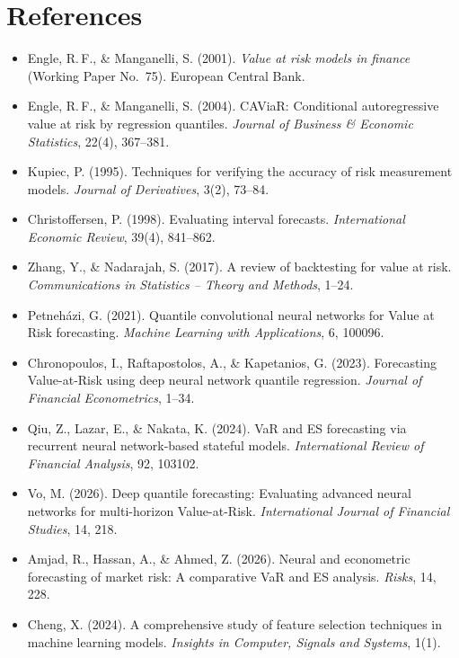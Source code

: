 \documentclass[10pt,a4paper]{article}
\begin{document}
\section*{References}
\begin{small}
\begin{itemize}[leftmargin=1.2em]
  \item Engle, R.\,F., \& Manganelli, S. (2001). \emph{Value at risk models in finance} (Working Paper No.~75). European Central Bank.
  \item Engle, R.\,F., \& Manganelli, S. (2004). CAViaR: Conditional autoregressive value at risk by regression quantiles. \emph{Journal of Business \& Economic Statistics}, 22(4), 367--381.
  \item Kupiec, P. (1995). Techniques for verifying the accuracy of risk measurement models. \emph{Journal of Derivatives}, 3(2), 73--84.
  \item Christoffersen, P. (1998). Evaluating interval forecasts. \emph{International Economic Review}, 39(4), 841--862.
  \item Zhang, Y., \& Nadarajah, S. (2017). A review of backtesting for value at risk. \emph{Communications in Statistics -- Theory and Methods}, 1--24.
  \item Petneházi, G. (2021). Quantile convolutional neural networks for Value at Risk forecasting. \emph{Machine Learning with Applications}, 6, 100096.
  \item Chronopoulos, I., Raftapostolos, A., \& Kapetanios, G. (2023). Forecasting Value-at-Risk using deep neural network quantile regression. \emph{Journal of Financial Econometrics}, 1--34.
  \item Qiu, Z., Lazar, E., \& Nakata, K. (2024). VaR and ES forecasting via recurrent neural network-based stateful models. \emph{International Review of Financial Analysis}, 92, 103102.
  \item Vo, M. (2026). Deep quantile forecasting: Evaluating advanced neural networks for multi-horizon Value-at-Risk. \emph{International Journal of Financial Studies}, 14, 218.
  \item Amjad, R., Hassan, A., \& Ahmed, Z. (2026). Neural and econometric forecasting of market risk: A comparative VaR and ES analysis. \emph{Risks}, 14, 228.
  \item Cheng, X. (2024). A comprehensive study of feature selection techniques in machine learning models. \emph{Insights in Computer, Signals and Systems}, 1(1).
\end{itemize}
\end{small}
\end{document}
